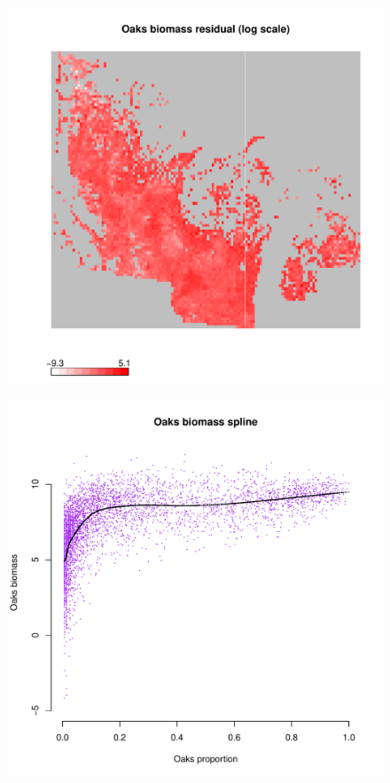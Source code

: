 \documentclass[authoryear, review, 11pt]{elsarticle}
\begin{document}
\begin{figure}
	\begin{center}
	\includegraphics[width=5in]{../../figures/Oaks-biomass-residual.pdf}
	\caption{\label{fig:oaks-biomass-residual}}
	\end{center}
\end{figure}

\begin{figure}
	\begin{center}
	\includegraphics[width=5in]{../../figures/Exploration/Oaks-biomass-spline.pdf}
	\caption{\label{fig:oaks-biomass-spline}}
	\end{center}
\end{figure}
\end{document}
